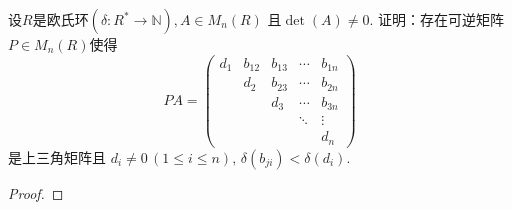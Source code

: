 \begin{problem}
    设$R$是欧氏环$(\delta: R^* \to \mathbb{N}), A \in M_n(R)$
且$\det(A) \neq 0$. 证明：存在可逆矩阵$P \in M_n(R)$使得
\[
    PA = 
    \begin{pmatrix}
        d_1 & b_{12} & b_{13} & \cdots & b_{1n}\\
        & d_2 & b_{23} & \cdots & b_{2n}\\
        & & d_3 & \cdots & b_{3n}\\
        & & & \ddots & \vdots\\
        & & & & d_n
    \end{pmatrix}
\]
是上三角矩阵且
$d_i \neq 0 \, (1 \leqslant i \leqslant n),\, \delta(b_{ji}) < \delta(d_i)$.
\end{problem}

\begin{proof}
    
\end{proof}